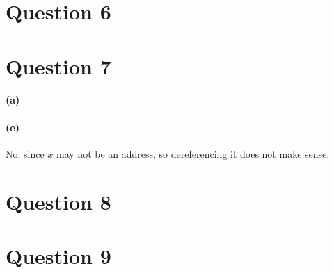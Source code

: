 \documentclass[11pt]{article} %
\begin{document}
\section*{Question 6}


\clearpage
\section*{Question 7}
\paragraph{(a)}









\paragraph{(e)}
No, since $x$ may not be an address, so dereferencing it does not make sense.


\clearpage
\section*{Question 8}


\section*{Question 9}

\end{document}
